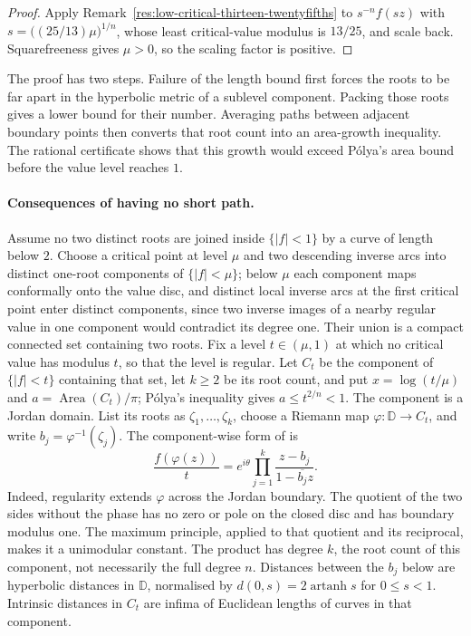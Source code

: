 \begin{proof}
Apply Remark~\ref{res:low-critical-thirteen-twentyfifths} to
$s^{-n}f(sz)$ with $s=\bigl((25/13)\mu\bigr)^{1/n}$, whose least
critical-value modulus is $13/25$, and scale back. Squarefreeness gives
$\mu>0$, so the scaling factor is positive.
\end{proof}

The proof has two steps. Failure of the length bound first forces the
roots to be far apart in the hyperbolic metric of a sublevel component.
Packing those roots gives a lower bound for their number. Averaging paths
between adjacent boundary points then converts that root count into an
area-growth inequality. The rational certificate shows that this growth
would exceed P\'olya's area bound before the value level reaches $1$.

\paragraph{Consequences of having no short path.}
Assume no two distinct roots are joined inside $\{|f|<1\}$ by a curve of
length below $2$.  Choose a critical point at level $\mu$ and two descending
inverse arcs into distinct one-root components of $\{|f|<\mu\}$; below $\mu$
each component maps conformally onto the value disc, and distinct local
inverse arcs at the first critical point enter distinct components, since two
inverse images of a nearby regular value in one component would contradict its
degree one.  Their union is a compact connected set containing two roots.
Fix a level $t\in(\mu,1)$ at which no critical value has modulus $t$,
so that the level is regular. Let $C_t$ be the component of
$\{|f|<t\}$ containing that set, let $k\ge2$ be its root count, and put
$x=\log(t/\mu)$ and
$a=\operatorname{Area}(C_t)/\pi$; P\'olya's inequality \cite[Theorem~1]{crane}
gives $a\le t^{2/n}<1$.
The component is a Jordan domain. List its roots as
$\zeta_1,\ldots,\zeta_k$, choose a Riemann map
$\varphi:\mathbb D\to C_t$, and write $b_j=\varphi^{-1}(\zeta_j)$.
The component-wise form of \cite[(2.2)]{eks2010} is
\[
 \frac{f(\varphi(z))}{t}
 =e^{i\theta}\prod_{j=1}^k\frac{z-b_j}{1-\overline{b_j}z}.
\]
Indeed, regularity extends $\varphi$ across the Jordan boundary. The
quotient of the two sides without the phase has no zero or pole on the
closed disc and has boundary modulus one. The maximum principle,
applied to that quotient and its reciprocal, makes it a unimodular
constant. The product has degree $k$, the root count of this component,
not necessarily the full degree $n$. Distances between the $b_j$ below are
hyperbolic distances in $\mathbb D$, normalised by
$d(0,s)=2\operatorname{artanh}s$ for $0\le s<1$. Intrinsic distances
in $C_t$ are infima of Euclidean lengths of curves in that component.

